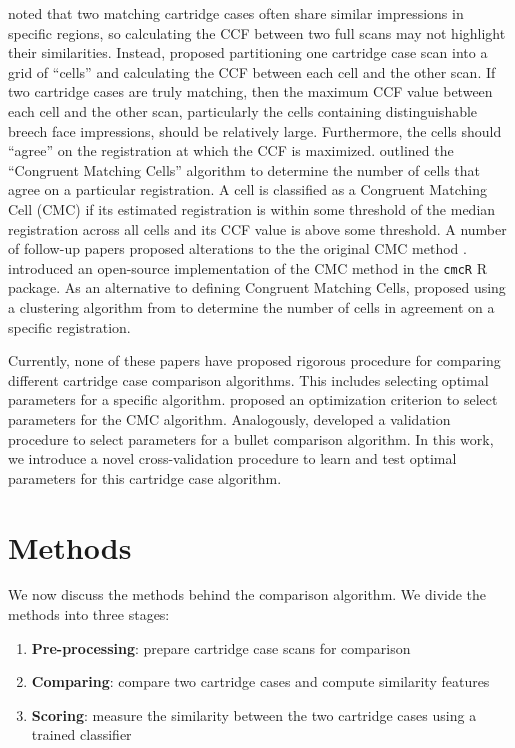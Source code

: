 \documentclass[preprint]{JASA}
\begin{document}
\citet{song_proposed_2013} noted that two matching cartridge cases often
share similar impressions in specific regions, so calculating the CCF
between two full scans may not highlight their similarities. Instead,
\citet{song_proposed_2013} proposed partitioning one cartridge case scan
into a grid of ``cells'' and calculating the CCF between each cell and
the other scan. If two cartridge cases are truly matching, then the
maximum CCF value between each cell and the other scan, particularly the
cells containing distinguishable breech face impressions, should be
relatively large. Furthermore, the cells should ``agree'' on the
registration at which the CCF is maximized. \citet{song_proposed_2013}
outlined the ``Congruent Matching Cells'' algorithm to determine the
number of cells that agree on a particular registration. A cell is
classified as a Congruent Matching Cell (CMC) if its estimated
registration is within some threshold of the median registration across
all cells and its CCF value is above some threshold. A number of
follow-up papers proposed alterations to the the original CMC method
\citep{tong_improved_2015, chen_convergence_2017}. \citet{cmcR}
introduced an open-source implementation of the CMC method in the
\texttt{cmcR} R package. As an alternative to defining Congruent
Matching Cells, \citet{zhang_convergence_2021} proposed using a
clustering algorithm from \citet{Ester1996} to determine the number of
cells in agreement on a specific registration.

Currently, none of these papers have proposed rigorous procedure for
comparing different cartridge case comparison algorithms. This includes
selecting optimal parameters for a specific algorithm.
\citet{Zemmels2023} proposed an optimization criterion to select
parameters for the CMC algorithm. Analogously,
\citet{hare_automatic_2016} developed a validation procedure to select
parameters for a bullet comparison algorithm. In this work, we introduce
a novel cross-validation procedure to learn and test optimal parameters
for this cartridge case algorithm.

\hypertarget{methods}{%
\section{Methods}\label{methods}}

We now discuss the methods behind the comparison algorithm. We divide
the methods into three stages:

\begin{enumerate}
\def\labelenumi{\arabic{enumi}.}
\item
  \textbf{Pre-processing}: prepare cartridge case scans for comparison
\item
  \textbf{Comparing}: compare two cartridge cases and compute similarity
  features
\item
  \textbf{Scoring}: measure the similarity between the two cartridge
  cases using a trained classifier
\end{enumerate}
\end{document}
